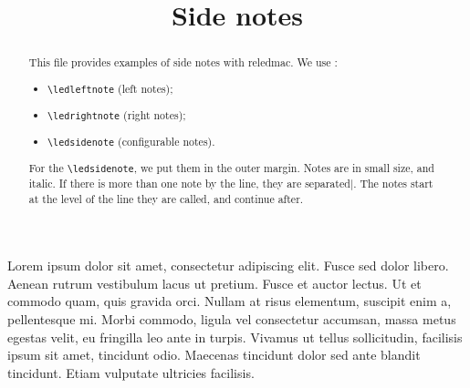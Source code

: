 \documentclass{article}
\begin{document}
\begin{english}
\title{Side notes}
\maketitle
\begin{abstract}
This file provides examples of side notes with reledmac. 
We use :
\begin{itemize}
  \item \verb+\ledleftnote+ (left notes); 
  \item \verb+\ledrightnote+ (right notes); 
  \item \verb+\ledsidenote+ (configurable notes).
\end{itemize}

For the \verb+\ledsidenote+, we put them in the outer margin.
Notes are in small size, and italic. If there is more than one note by the line, they are separated$ | $. The notes start at the level of the line they are called, and continue after.
\end{abstract}
\end{english}

\beginnumbering
\pstart
Lorem ipsum dolor sit amet, consectetur adipiscing elit. Fusce sed dolor libero. Aenean rutrum vestibulum lacus ut pretium. Fusce et auctor lectus. Ut et commodo quam, quis gravida orci. Nullam at risus elementum, suscipit enim a, pellentesque mi. Morbi commodo, ligula vel consectetur accumsan, massa metus egestas velit, eu fringilla leo ante in turpis. Vivamus ut tellus sollicitudin, facilisis ipsum sit amet, tincidunt odio. Maecenas tincidunt dolor sed ante blandit tincidunt. Etiam vulputate ultricies facilisis.
\pend
\endnumbering
\end{document}
